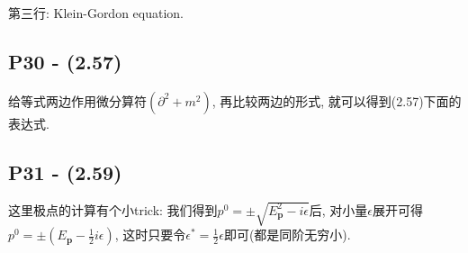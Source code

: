 第三行: Klein-Gordon equation.

\subsection{P30 - (2.57)}

给等式两边作用微分算符$(\partial^2 + m^2)$, 再比较两边的形式, 就可以得到(2.57)下面的表达式.

\subsection{P31 - (2.59)}

这里极点的计算有个小trick: 我们得到$p^0 = \pm\sqrt{E_\mathbf{p}^2 - i\epsilon}$后, 对小量$\epsilon$展开可得$p^0 = \pm (E_\mathbf{p} - \frac{1}{2}i\epsilon)$, 这时只要令$\epsilon^* = \frac{1}{2}\epsilon$即可(都是同阶无穷小).
